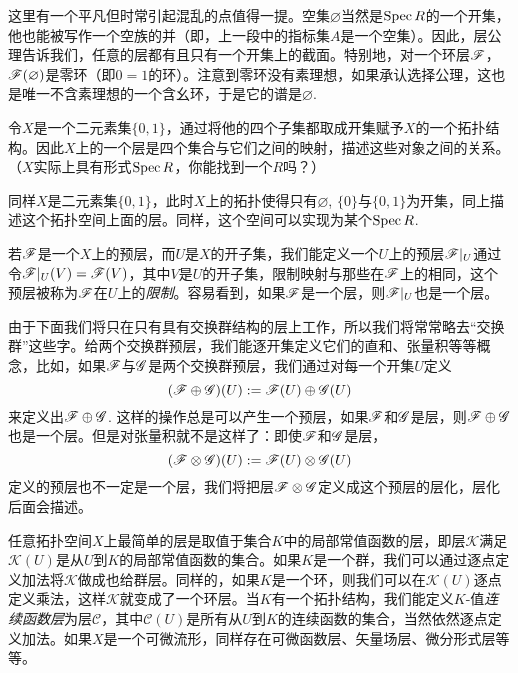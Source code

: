 这里有一个平凡但时常引起混乱的点值得一提。空集$\varnothing$当然是$\operatorname{Spec} R$的一个开集，他也能被写作一个空族的并（即，上一段中的指标集$A$是一个空集）。因此，层公理告诉我们，任意的层都有且只有一个开集上的截面。特别地，对一个环层$\mathscr{F}$，$\mathscr{F}(\varnothing)$是零环（即$0=1$的环）。注意到零环没有素理想，如果承认选择公理，这也是唯一不含素理想的一个含幺环，于是它的谱是$\varnothing$.

\begin{exe}
	\begin{compactenum}[{(a)}]
		\item 令$X$是一个二元素集$\{0,1\}$，通过将他的四个子集都取成开集赋予$X$的一个拓扑结构。因此$X$上的一个层是四个集合与它们之间的映射，描述这些对象之间的关系。（$X$实际上具有形式$\operatorname{Spec} R$，你能找到一个$R$吗？）
		\item 同样$X$是二元素集$\{0,1\}$，此时$X$上的拓扑使得只有$\varnothing$, $\{0\}$与$\{0,1\}$为开集，同上描述这个拓扑空间上面的层。同样，这个空间可以实现为某个$\operatorname{Spec} R$.
	\end{compactenum}
\end{exe}

若$\mathscr{F}$是一个$X$上的预层，而$U$是$X$的开子集，我们能定义一个$U$上的预层$\mathscr{F}|_U$通过令$\mathscr{F}|_U(V)=\mathscr{F}(V)$，其中$V$是$U$的开子集，限制映射与那些在$\mathscr{F}$上的相同，这个预层被称为$\mathscr{F}$在$U$上的\textit{限制}。容易看到，如果$\mathscr{F}$是一个层，则$\mathscr{F}|_U$也是一个层。

由于下面我们将只在只有具有交换群结构的层上工作，所以我们将常常略去“交换群”这些字。给两个交换群预层，我们能逐开集定义它们的直和、张量积等等概念，比如，如果$\mathscr{F}$与$\mathscr{G}$是两个交换群预层，我们通过对每一个开集$U$定义
\[
	(\mathscr{F}\oplus\mathscr{G})(U):=\mathscr{F}(U)\oplus \mathscr{G}(U)
\]
来定义出$\mathscr{F}\oplus\mathscr{G}$. 这样的操作总是可以产生一个预层，如果$\mathscr{F}$和$\mathscr{G}$是层，则$\mathscr{F}\oplus\mathscr{G}$也是一个层。但是对张量积就不是这样了：即使$\mathscr{F}$和$\mathscr{G}$是层，
\[
	(\mathscr{F}\otimes\mathscr{G})(U):=\mathscr{F}(U)\otimes \mathscr{G}(U)
\]
定义的预层也不一定是一个层，我们将把层$\mathscr{F}\otimes\mathscr{G}$定义成这个预层的层化，层化后面会描述。

任意拓扑空间$X$上最简单的层是取值于集合$K$中的局部常值函数的层，即层$\mathscr{K}$满足$\mathscr{K}(U)$是从$U$到$K$的局部常值函数的集合。如果$K$是一个群，我们可以通过逐点定义加法将$\mathscr{K}$做成也给群层。同样的，如果$K$是一个环，则我们可以在$\mathscr{K}(U)$逐点定义乘法，这样$\mathscr{K}$就变成了一个环层。当$K$有一个拓扑结构，我们能定义$K$-值\textit{连续函数层}为层$\mathscr{C}$，其中$\mathscr{C}(U)$是所有从$U$到$K$的连续函数的集合，当然依然逐点定义加法。如果$X$是一个可微流形，同样存在可微函数层、矢量场层、微分形式层等等。

